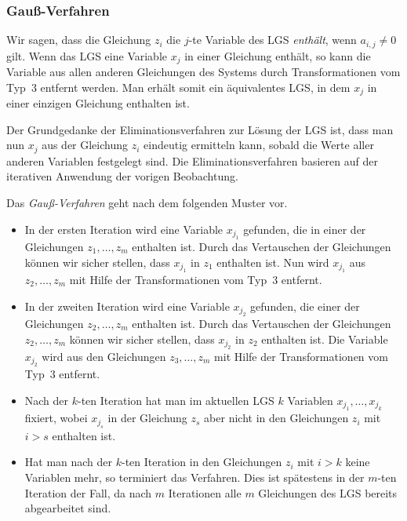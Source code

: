\begin{appendices}
\subsubsection{Gauß-Verfahren}

Wir sagen, dass die Gleichung $z_i$ die $j$-te Variable des LGS \emph{enthält}, wenn $a_{i,j} \ne 0$ gilt. Wenn das LGS eine Variable $x_{j}$ in einer Gleichung enthält, so kann die Variable aus allen anderen Gleichungen des Systems durch Transformationen vom Typ~3 entfernt werden. Man erhält somit ein äquivalentes LGS, in dem $x_j$ in einer einzigen Gleichung enthalten ist. 

Der Grundgedanke der Eliminationsverfahren zur Lösung der LGS ist, dass man nun $x_j$ aus der Gleichung $z_i$ eindeutig ermitteln kann, sobald die Werte aller anderen Variablen festgelegt sind. Die Eliminationsverfahren basieren auf der iterativen Anwendung der vorigen Beobachtung. 


\begin{framed} 
	Das \emph{Gauß-Verfahren} geht nach dem folgenden Muster vor.
	
	\begin{itemize} 
		\item In der ersten Iteration wird eine Variable $x_{j_1}$ gefunden, die in einer der Gleichungen $z_1,\ldots,z_m$ enthalten ist. Durch das Vertauschen der Gleichungen können wir sicher stellen, dass $x_{j_1}$ in $z_1$ enthalten ist. Nun wird $x_{j_1}$ aus $z_2,\ldots,z_m$ mit Hilfe der Transformationen vom Typ~3 entfernt. 
	
		\item In der zweiten Iteration wird eine Variable $x_{j_2}$ gefunden, die einer der Gleichungen $z_2,\ldots,z_m$ enthalten ist. Durch das Vertauschen der Gleichungen $z_2,\ldots,z_m$ können wir sicher stellen, dass $x_{j_2}$ in $z_2$ enthalten ist. Die Variable $x_{j_2}$ wird aus den Gleichungen $z_3,\ldots,z_m$ mit Hilfe der Transformationen vom Typ~3 entfernt. 
	
		\item Nach der $k$-ten Iteration hat man im aktuellen LGS $k$ Variablen $x_{j_1},\ldots,x_{j_k}$ fixiert, wobei $x_{j_s}$ in der Gleichung $z_s$ aber nicht in den Gleichungen $z_i$ mit $i > s$ enthalten ist. 
		\item 	Hat man nach der $k$-ten Iteration in den Gleichungen $z_i$ mit $i > k$ keine Variablen mehr, so terminiert das Verfahren. Dies ist spätestens in der $m$-ten Iteration der Fall, da nach $m$ Iterationen alle $m$ Gleichungen des LGS bereits abgearbeitet sind. 
	\end{itemize} 
	

\end{framed}
\end{appendices}
